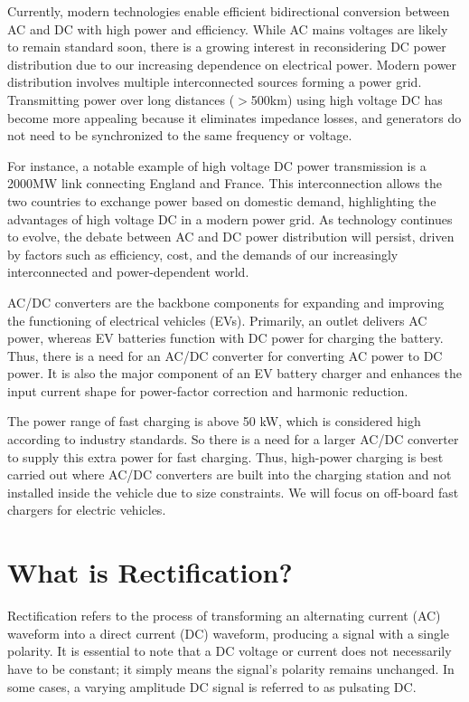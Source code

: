 \documentclass[12pt,a4paper]{book}
\begin{document}
Currently, modern technologies enable efficient bidirectional conversion between AC and DC with high power and efficiency. While AC mains voltages are likely to remain standard soon, there is a growing interest in reconsidering DC power distribution due to our increasing dependence on electrical power. Modern power distribution involves multiple interconnected sources forming a power grid. Transmitting power over long distances (\(>\)500km) using high voltage DC has become more appealing because it eliminates impedance losses, and generators do not need to be synchronized to the same frequency or voltage.

For instance, a notable example of high voltage DC power transmission is a 2000MW link connecting England and France. This interconnection allows the two countries to exchange power based on domestic demand, highlighting the advantages of high voltage DC in a modern power grid. As technology continues to evolve, the debate between AC and DC power distribution will persist, driven by factors such as efficiency, cost, and the demands of our increasingly interconnected and power-dependent world.

AC/DC converters are the backbone components for expanding and improving the functioning of electrical vehicles (EVs). Primarily, an outlet delivers AC power, whereas EV batteries function with DC power for charging the battery. Thus, there is a need for an AC/DC converter for converting AC power to DC power. It is also the major component of an EV battery charger and enhances the input current shape for power-factor correction and harmonic reduction.

The power range of fast charging is above 50 kW, which is considered high according to industry standards. So there is a need for a larger AC/DC converter to supply this extra power for fast charging. Thus, high-power charging is best carried out where AC/DC converters are built into the charging station and not installed inside the vehicle due to size constraints\cite{acdc2023}. We will focus on off-board fast chargers for electric vehicles.

\chapter{What is Rectification?}
Rectification refers to the process of transforming an alternating current (AC) waveform into a direct current (DC) waveform, producing a signal with a single polarity. It is essential to note that a DC voltage or current does not necessarily have to be constant; it simply means the signal's polarity remains unchanged. In some cases, a varying amplitude DC signal is referred to as pulsating DC.
\end{document}
